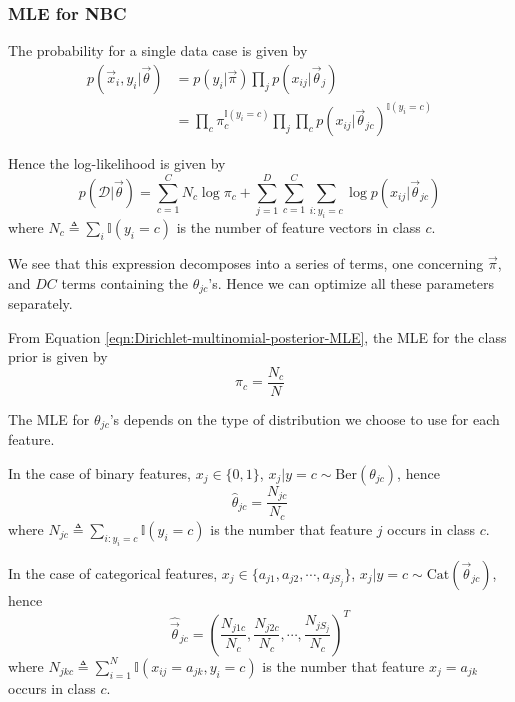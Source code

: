 {\subsubsection{MLE for NBC}
The probability for a single data case is given by
\begin{equation}\begin{split}
p(\vec{x}_i,y_i|\vec{\theta}) & =p(y_i|\vec{\pi})\prod\limits_j p(x_{ij}|\vec{\theta}_j) \\
  & =\prod\limits_c \pi_c^{\mathbb{I}(y_i=c)} \prod\limits_j\prod\limits_c p(x_{ij}|\vec{\theta}_{jc})^{\mathbb{I}(y_i=c)}
\end{split}\end{equation}

Hence the log-likelihood is given by
\begin{equation}
p(\mathcal{D}|\vec{\theta})=\sum\limits_{c=1}^C{N_c\log\pi_c}+ \sum\limits_{j=1}^D{\sum\limits_{c=1}^C{\sum\limits_{i:y_i=c}{\log p(x_{ij}|\vec{\theta}_{jc})}}}
\end{equation}
where $N_c \triangleq \sum\limits_i \mathbb{I}(y_i=c)$ is the number of feature vectors in class $c$.

We see that this expression decomposes into a series of terms, one concerning $\vec{\pi}$, and $DC$ terms containing the $\theta_{jc}$’s. Hence we can optimize all these parameters separately.

From Equation \ref{eqn:Dirichlet-multinomial-posterior-MLE}, the MLE for the class prior is given by
\begin{equation}
\hat{\pi}_c=\dfrac{N_c}{N}
\end{equation}

The MLE for $\theta_{jc}$’s depends on the type of distribution we choose to use for each feature. 

In the case of binary features, $x_j \in \{0,1\}$, $x_j|y=c \sim \text{Ber}(\theta_{jc})$, hence
\begin{equation}
\hat{\theta}_{jc}=\dfrac{N_{jc}}{N_c}
\end{equation}
where $N_{jc} \triangleq \sum\limits_{i:y_i=c} \mathbb{I}(y_i=c)$ is the number that feature $j$ occurs in class $c$.

In the case of categorical features, $x_j \in \{a_{j1},a_{j2},\cdots, a_{jS_j}\}$, $x_j|y=c \sim \text{Cat}(\vec{\theta}_{jc})$, hence
\begin{equation}
\hat{\vec{\theta}}_{jc}=(\dfrac{N_{j1c}}{N_c},\dfrac{N_{j2c}}{N_c}, \cdots, \dfrac{N_{jS_j}}{N_c})^T
\end{equation}
where $N_{jkc} \triangleq \sum\limits_{i=1}^N \mathbb{I}(x_{ij}=a_{jk}, y_i=c)$ is the number that feature $x_j=a_{jk}$ occurs in class $c$.


}
